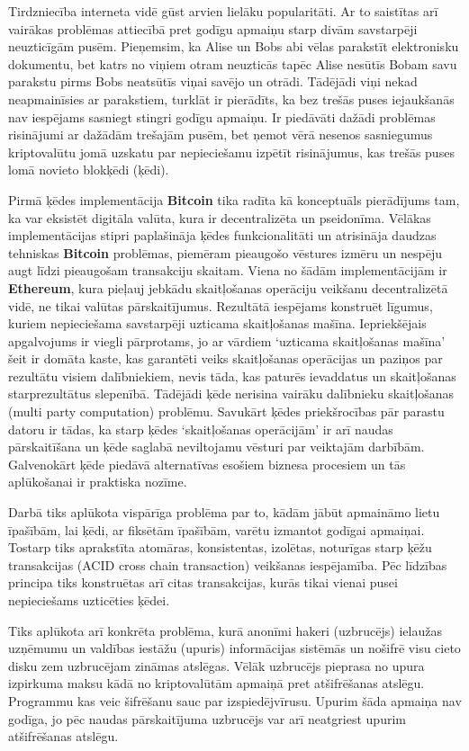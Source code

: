 Tirdzniecība interneta vidē gūst arvien lielāku popularitāti. 
Ar to saistītas arī vairākas problēmas attiecībā pret godīgu apmaiņu starp divām savstarpēji neuzticīgām pusēm. 
Pieņemsim, ka Alise un Bobs abi vēlas parakstīt elektronisku dokumentu, bet katrs no viņiem otram neuzticās tapēc Alise nesūtīs Bobam savu parakstu pirms Bobs neatsūtīs viņai savējo un otrādi. 
Tādējādi viņi nekad neapmainīsies ar parakstiem, turklāt ir pierādīts, ka bez trešās puses iejaukšanās nav iespējams sasniegt stingri godīgu apmaiņu.\cite{pagnia99}
Ir piedāvāti dažādi problēmas risinājumi ar dažādām trešajām pusēm, bet ņemot vērā nesenos sasniegumus kriptovalūtu jomā uzskatu par nepieciešamu izpētīt risinājumus, kas trešās puses lomā novieto blokķēdi (ķēdi). 

Pirmā ķēdes implementācija \textbf{Bitcoin} tika radīta kā konceptuāls pierādījums tam, ka var eksistēt digitāla valūta, kura ir decentralizēta un pseidonīma. 
Vēlākas implementācijas stipri paplašināja ķēdes funkcionalitāti un atrisināja daudzas tehniskas \textbf{Bitcoin} problēmas, piemēram pieaugošo vēstures izmēru un nespēju augt līdzi pieaugošam transakciju skaitam. 
Viena no šādām implementācijām ir \textbf{Ethereum}, kura pieļauj jebkādu skaitļošanas operāciju veikšanu decentralizētā vidē, ne tikai valūtas pārskaitījumus.\cite{etherum}
Rezultātā iespējams konstruēt līgumus, kuriem nepieciešama savstarpēji uzticama skaitļošanas mašīna.
Iepriekšējais apgalvojums ir viegli pārprotams, jo ar vārdiem `uzticama skaitļošanas mašīna' šeit ir domāta kaste, kas garantēti veiks skaitļošanas operācijas un paziņos par rezultātu visiem dalībniekiem, nevis tāda, kas paturēs ievaddatus un skaitļošanas starprezultātus slepenībā.
Tādējādi ķēde nerisina vairāku dalībnieku skaitļošanas (multi party computation) problēmu.
Savukārt ķēdes priekšrocības pār parastu datoru ir tādas, ka starp ķēdes `skaitļošanas operācijām' ir arī naudas pārskaitīšana un ķēde saglabā neviltojamu vēsturi par veiktajām darbībām.
Galvenokārt ķēde piedāvā alternatīvas esošiem biznesa procesiem un tās aplūkošanai ir praktiska nozīme.

Darbā tiks aplūkota vispārīga problēma par to, kādām jābūt apmaināmo lietu īpašībām, lai ķēdi, ar fiksētām īpašībām, varētu izmantot godīgai apmaiņai. Tostarp tiks aprakstīta atomāras, konsistentas, izolētas, noturīgas starp ķēžu transakcijas (ACID cross chain transaction) veikšanas iespējamība.\cite{back14,nolan13} Pēc līdzības principa tiks konstruētas arī citas transakcijas, kurās tikai vienai pusei nepieciešams uzticēties ķēdei.

Tiks aplūkota arī konkrēta problēma, kurā anonīmi hakeri (uzbrucējs) ielaužas uzņēmumu un valdības iestāžu (upuris) informācijas sistēmās un nošifrē visu cieto disku zem uzbrucējam zināmas atslēgas. 
Vēlāk uzbrucējs pieprasa no upura izpirkuma maksu kādā no kriptovalūtām apmaiņā pret atšifrēšanas atslēgu. Programmu kas veic šifrēšanu sauc par izspiedējvīrusu.
Upurim šāda apmaiņa nav godīga, jo pēc naudas pārskaitījuma uzbrucējs var arī neatgriest upurim atšifrēšanas atslēgu. %
